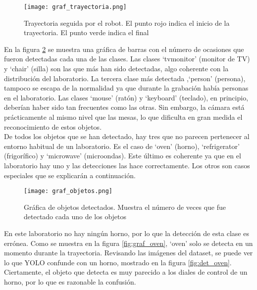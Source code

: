 \begin{figure}[h]
	\begin{center} 
		\texttt{[image: graf\_trayectoria.png]}
	\end{center}
	\caption{Trayectoria seguida por el robot. El punto rojo indica el inicio de la trayectoria. El punto verde indica el final}
	\label{fig:graf_trayectoria}
\end{figure}

En la figura \ref{fig:graf_objetos} se muestra una gráfica de barras con el número de ocasiones que fueron detectadas cada una de las clases. Las clases `tvmonitor' (monitor de TV) y `chair' (silla) son las que más han sido detectadas, algo coherente con la distribución del laboratorio. La tercera clase más detectada ,`person' (persona), tampoco se escapa de la normalidad ya que durante la grabación había personas en el laboratorio. Las clases `mouse' (ratón) y `keyboard' (teclado), en principio, deberían haber sido tan frecuentes como las otras. Sin embargo, la cámara está prácticamente al mismo nivel que las mesas, lo que dificulta en gran medida el reconocimiento de estos objetos.\\

De todos los objetos que se han detectado, hay tres que no parecen pertenecer al entorno habitual de un laboratorio. Es el caso de `oven' (horno), `refrigerator' (frigorífico) y `microwave' (microondas). Este último es coherente ya que en el laboratorio hay uno y las detecciones las hace correctamente. Los otros son casos especiales que se explicarán a continuación.\\

\begin{figure}[h]
	\begin{center} 
		\texttt{[image: graf\_objetos.png]}
	\end{center}
	\caption{Gráfica de objetos detectados. Muestra el número de veces que fue detectado cada uno de los objetos}
	\label{fig:graf_objetos}
\end{figure}

En este laboratorio no hay ningún horno, por lo que la detección de esta clase es errónea. Como se muestra en la figura \ref{fig:graf_oven}, `oven' solo se detecta en un momento durante la trayectoria. Revisando las imágenes del dataset, se puede ver lo que YOLO confunde con un horno, mostrado en la figura \ref{fig:det_oven}. Ciertamente, el objeto que detecta es muy parecido a los diales de control de un horno, por lo que es razonable la confusión.\\

